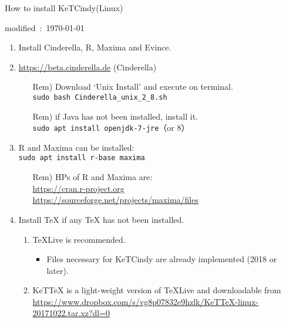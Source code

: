 \documentclass{article}
\begin{document}
\begin{center}
How to install KeTCindy(Linux)
\end{center}

\hfill modified\ :\ \today

\begin{enumerate}[\bf\large 1.]

\item Install Cinderella, R, Maxima and Evince.
 \item \url{https://beta.cinderella.de}  (Cinderella)
    \begin{itemize}
    \item[Rem)]Download `Unix Install' and execute on terminal.\\
    \hspace*{10mm}\verb|sudo bash Cinderella_unix_2_8.sh|
    \item[Rem)]if Java has not been installed, install it.\\
     \hspace*{10mm}\verb|sudo apt install openjdk-7-jre|（or 8）
    \end{itemize}
   \item R and Maxima can be installed:\\
\hspace*{10mm}\verb|sudo apt install r-base maxima|
    \begin{itemize}
    \item[Rem)]HPs of R and Maxima are:\\
    \hspace*{10mm}\url{https://cran.r-project.org}\\
    \hspace*{10mm}\url{https://sourceforge.net/projects/maxima/files}
    \end{itemize}
\item Install TeX if any TeX has not been installed.
  \begin{enumerate}[(1)]
  \item TeXLive is recommended.
    \begin{itemize}
    \item Files necessary for KeTCindy are already implemented (2018 or later).
    \end{itemize}
  \item KeTTeX is a light-weight version of TeXLive and downloadable from\\
  \hspace*{6mm}\url{https://www.dropbox.com/s/vg8p07832e9hzlk/KeTTeX-linux-20171022.tar.xz?dl=0}
 \end{enumerate}


\end{enumerate}
\end{document}
